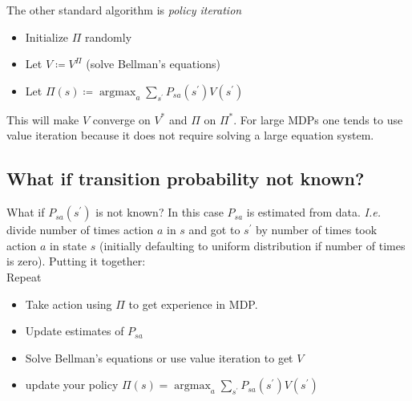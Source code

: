 \documentclass{article}
\begin{document}
The other standard algorithm is \emph{policy iteration}
\begin{itemize}
  \item Initialize $\Pi$ randomly
  \item Let $V\coloneqq V^\Pi$ (solve Bellman's equations)
  \item Let $\Pi(s)\coloneqq\mathop{\operatorname{argmax}}_a \sum_{s^\prime} P_{sa}(s^\prime)V(s^\prime)$
\end{itemize}
This will make $V$ converge on $V^\ast$ and $\Pi$ on $\Pi^\ast$.
For large MDPs one tends to use value iteration because it does not require solving a large equation system.

\subsection{What if transition probability not known?}
What if $P_{sa}(s^\prime)$ is not known?
In this case $P_{sa}$ is estimated from data.
\emph{I.e.} divide number of times action $a$ in $s$ and got to $s^\prime$ by
number of times took action $a$ in state $s$ (initially defaulting to uniform distribution if number of times is zero).
Putting it together:\\
Repeat
\begin{itemize}
  \item Take action using $\Pi$ to get experience in MDP.
  \item Update estimates of $P_{sa}$
  \item Solve Bellman's equations or use value iteration to get $V$
  \item update your policy $\Pi(s)=\mathop{\operatorname{argmax}}_a \sum_{s^\prime} P_{sa}(s^\prime) V(s^\prime)$
\end{itemize}
\end{document}
